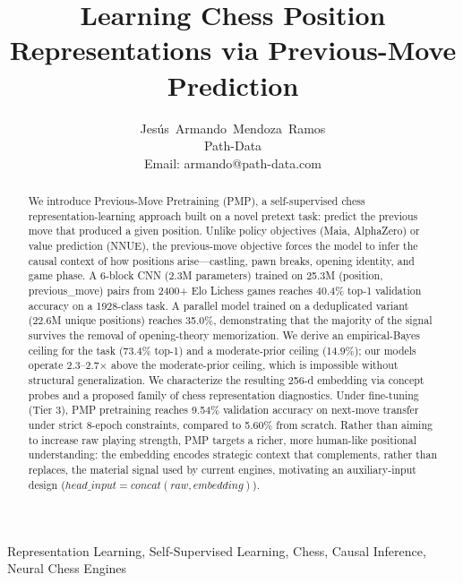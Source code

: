 \documentclass[journal]{IEEEtran}
\begin{document}
\title{Learning Chess Position Representations via Previous-Move Prediction}

\author{Jes\'us~Armando~Mendoza~Ramos\\
Path-Data\\
Email: armando@path-data.com}

\maketitle

\begin{abstract}
We introduce Previous-Move Pretraining (PMP), a self-supervised chess representation-learning approach built on a novel pretext task: predict the previous move that produced a given position. Unlike policy objectives (Maia, AlphaZero) or value prediction (NNUE), the previous-move objective forces the model to infer the causal context of how positions arise---castling, pawn breaks, opening identity, and game phase. A 6-block CNN (2.3M parameters) trained on 25.3M (position, previous\_move) pairs from 2400+ Elo Lichess games reaches 40.4\% top-1 validation accuracy on a 1928-class task. A parallel model trained on a deduplicated variant (22.6M unique positions) reaches 35.0\%, demonstrating that the majority of the signal survives the removal of opening-theory memorization. We derive an empirical-Bayes ceiling for the task (73.4\% top-1) and a moderate-prior ceiling (14.9\%); our models operate 2.3--2.7$\times$ above the moderate-prior ceiling, which is impossible without structural generalization. We characterize the resulting 256-d embedding via concept probes and a proposed family of chess representation diagnostics. Under fine-tuning (Tier 3), PMP pretraining reaches 9.54\% validation accuracy on next-move transfer under strict 8-epoch constraints, compared to 5.60\% from scratch. Rather than aiming to increase raw playing strength, PMP targets a richer, more human-like positional understanding: the embedding encodes strategic context that complements, rather than replaces, the material signal used by current engines, motivating an auxiliary-input design ($head\_input = concat(raw, embedding)$).
\end{abstract}

\begin{IEEEkeywords}
Representation Learning, Self-Supervised Learning, Chess, Causal Inference, Neural Chess Engines
\end{IEEEkeywords}
\end{document}
